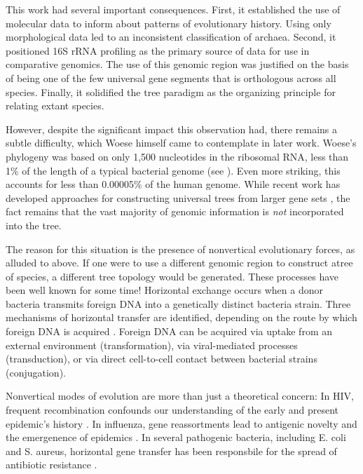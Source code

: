 This work had several important consequences.
First, it established the use of molecular data to inform about patterns of evolutionary history.
Using only morphological data led to an inconsistent classification of archaea.
Second, it positioned 16S rRNA profiling as the primary source of data for use in comparative genomics.
The use of this genomic region was justified on the basis of being one of the few universal gene segments  that is orthologous across all species.
Finally, it solidified the tree paradigm as the organizing principle for relating extant species.

However, despite the significant impact this observation had, there remains a subtle difficulty, which Woese himself came to contemplate in later work.
Woese's phylogeny was based on only 1,500 nucleotides in the ribosomal RNA, less than 1\% of the length of a typical bacterial genome (see \cite{Dagan:2006up}).
Even more striking, this accounts for less than 0.00005\% of the human genome.
While recent work has developed approaches for constructing universal trees from larger gene sets \cite{Ciccarelli:2006gw}, the fact remains that the vast majority of genomic information is \emph{not} incorporated into the tree.

The reason for this situation is the presence of nonvertical evolutionary forces, as alluded to above.
If one were to use a different genomic region to construct atree of species, a different tree topology would be generated.
These processes have been well known for some time!
Horizontal exchange occurs when a donor bacteria transmits foreign DNA into a genetically distinct bacteria strain.
Three mechanisms of horizontal transfer are identified, depending on the route by which foreign DNA is acquired \cite{Ochman:2000dr}.
Foreign DNA can be acquired via uptake from an external environment (transformation), via viral-mediated processes (transduction), or via direct cell-to-cell contact between bacterial strains (conjugation).



Nonvertical modes of evolution are more than just a theoretical concern:
In HIV, frequent recombination confounds our understanding of the early and present epidemic’s history \kje{[cite]}.
In influenza, gene reassortments lead to antigenic novelty and the emergenence of epidemics \kje{[cite]}.
In several pathogenic bacteria, including E. coli and S. aureus, horizontal gene transfer has been responsbile for the spread of antibiotic resistance \kje{[cite]}.

